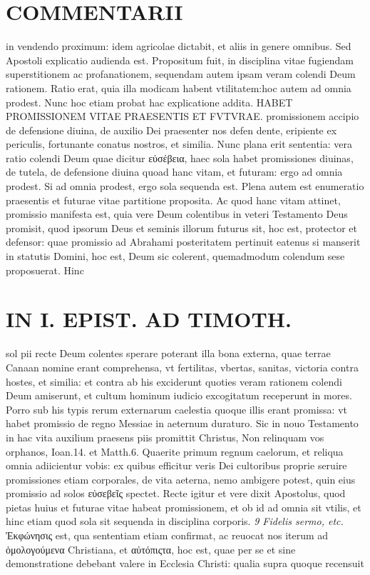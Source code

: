 \documentclass{article}
\begin{document}
\begin{pages}
\section*{COMMENTARII }
\marginpar{[ p.100 ]}\pstart in vendendo proximum: idem agricolae dictabit, et aliis in genere omnibus. Sed Apostoli explicatio audienda est. Propositum fuit, in disciplina vitae fugiendam superstitionem ac profanationem, sequendam autem ipsam veram colendi Deum rationem. Ratio erat, quia illa modicam habent vtilitatem:hoc autem ad omnia prodest. Nunc hoc etiam probat hac explicatione addita. HABET PROMISSIONEM VITAE PRAESENTIS ET FVTVRAE. promissionem accipio de defensione diuina, de auxilio Dei praesenter nos defen dente, eripiente ex periculis, fortunante conatus nostros, et similia. Nunc plana erit sententia: vera ratio colendi Deum quae dicitur εὐσέβεια, haec sola habet promissiones diuinas, de tutela, de defensione diuina quoad hanc vitam, et futuram: ergo ad omnia prodest. Si ad omnia prodest, ergo sola sequenda est. Plena autem est enumeratio praesentis et futurae vitae partitione proposita. Ac quod hanc vitam attinet, promissio manifesta est, quia vere Deum colentibus in veteri Testamento Deus promisit, quod ipsorum Deus et seminis illorum futurus sit, hoc est, protector et defensor: quae promissio ad Abrahami posteritatem pertinuit eatenus si manserit in statutis Domini, hoc est, Deum sic colerent, quemadmodum colendum sese proposuerat. Hinc  \pend
\section*{IN I. EPIST. AD TIMOTH. }
\marginpar{[ p.101 ]}\pstart sol pii recte Deum colentes sperare poterant illa bona externa, quae terrae Canaan nomine erant comprehensa, vt fertilitas, vbertas, sanitas, victoria contra hostes, et similia: et contra ab his exciderunt quoties veram rationem colendi Deum amiserunt, et cultum hominum iudicio excogitatum receperunt in mores. Porro sub his typis rerum externarum caelestia quoque illis erant promissa: vt habet promissio de regno Messiae in aeternum duraturo. Sic in nouo Testamento in hac vita auxilium praesens piis promittit Christus, Non relinquam vos orphanos, Ioan.14. et Matth.6. Quaerite primum regnum caelorum, et reliqua omnia adiicientur vobis: ex quibus efficitur veris Dei cultoribus proprie seruire promissiones etiam corporales, de vita aeterna, nemo ambigere potest, quin eius promissio ad solos εὐσεβεῖς spectet. Recte igitur et vere dixit Apostolus, quod pietas huius et futurae vitae habeat promissionem, et ob id ad omnia sit vtilis, et hinc etiam quod sola sit sequenda in disciplina corporis.  \pend
\textit{9 Fidelis sermo, etc. }\pstart Ἐκφώνησις est, qua sententiam etiam confirmat, ac reuocat nos iterum ad ὁμολογούμενα Christiana, et αὐτόπιςτα, hoc est, quae per se et sine demonstratione debebant valere in Ecclesia Christi: qualia supra quoque recensuit  \pend

\end{pages}
\end{document}
